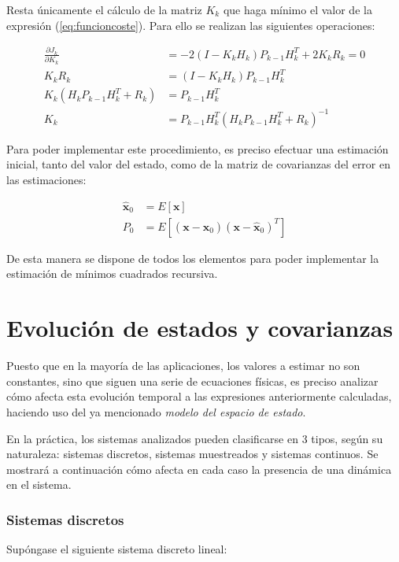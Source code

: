 Resta únicamente el cálculo de la matriz $K_k$ que haga mínimo el valor de la expresión (\ref{eq:funcioncoste}). Para ello se realizan las siguientes operaciones:

\begin{equation}
\begin{split}
	\frac{\partial J_k}{\partial K_k} &= -2(I - K_kH_k)P_{k-1}H_k^T + 2K_kR_k = 0 \\
	K_kR_k &= (I - K_kH_k)P_{k-1}H_k^T \\
	K_k(H_kP_{k-1}H_k^T + R_k) &= P_{k-1}H_k^T \\
	K_k &= P_{k-1}H_k^T(H_kP_{k-1}H_k^T + R_k)^{-1}
\end{split}
\label{eq:ecuacionK}
\end{equation}

Para poder implementar este procedimiento, es preciso efectuar una estimación inicial, tanto del valor del estado, como de la matriz de covarianzas del error en las estimaciones: 

\[
\begin{split}
	\boldsymbol{\hat{x}}_0 &= E[\boldsymbol{x}] \\
	P_0 &= E[(\boldsymbol{x}-\boldsymbol{\hat{x}}_0) (\boldsymbol{x}-\boldsymbol{\hat{x}}_0)^T]
\end{split}
\]

De esta manera se dispone de todos los elementos para poder implementar la estimación de mínimos cuadrados recursiva. \par 

\section{Evolución de estados y covarianzas}

Puesto que en la mayoría de las aplicaciones, los valores a estimar no son constantes, sino que siguen una serie de ecuaciones físicas, es preciso analizar cómo afecta esta evolución temporal a las expresiones anteriormente calculadas, haciendo uso del ya mencionado \emph{modelo del espacio de estado}. \par 

En la práctica, los sistemas analizados pueden clasificarse en 3 tipos, según su naturaleza: sistemas discretos, sistemas muestreados y sistemas continuos. Se mostrará a continuación cómo afecta en cada caso la presencia de una dinámica en el sistema.

\subsubsection{Sistemas discretos}
\noindent
Supóngase el siguiente sistema discreto lineal:

